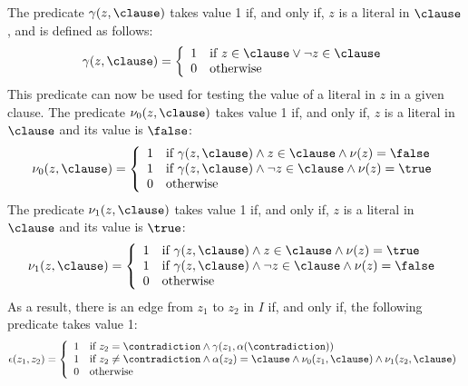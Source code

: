 \begin{definition}
    The predicate $\gamma(z, \clause)$ takes value 1 if, and only if, $z$
    is a literal in $\clause$, and is defined as follows:
    \begin{equation}
        \gamma(z, \clause) = 
        \left\{
            \begin{array}{ll}
                1 & \text{if $z \in \clause \lor \neg z \in \clause$} \\
                0 & \text{otherwise}
            \end{array}
        \right.
    \end{equation}
    This predicate can now be used for testing the value of a literal in $z$ in
    a given clause. The predicate $\nu_0(z, \clause)$ takes value 1 if, and only
    if, $z$ is a literal in $\clause$ and its value is $\false$:
    \begin{equation}
        \nu_0(z, \clause) = 
        \left\{
            \begin{array}{ll}
                1 & \text{if $\gamma(z, \clause) \land z \in \clause \land \nu(z) = \false$}\\
                1 & \text{if $\gamma(z, \clause) \land \neg z \in \clause \land
                \nu(z) = \true$}\\
                0 & \text{otherwise}
            \end{array}
        \right.
    \end{equation}
    The predicate $\nu_1(z, \clause)$ takes value 1 if, and only if, $z$ is a
    literal in $\clause$ and its value is $\true$:
    \begin{equation}
        \nu_1(z, \clause) = 
        \left\{
            \begin{array}{ll}
                1 & \text{if $\gamma(z, \clause) \land z \in \clause \land
                \nu(z) = \true$}\\
                1 & \text{if $\gamma(z, \clause) \land \neg z \in \clause \land
                \nu(z) = \false$}\\
                0 & \text{otherwise}
            \end{array}
        \right.
    \end{equation}
    As a result, there is an edge from $z_1$ to $z_2$ in $I$ if, and only if,
    the following predicate takes value 1:
    \begin{equation}
        \epsilon(z_1, z_2) = 
        \left\{
            \begin{array}{ll}
                1 & \text{if $z_2 = \contradiction \land \gamma(z_1, \alpha(\contradiction))$}\\
                1 & \text{if $z_2 \neq \contradiction \land \alpha(z_2) = \clause \land \nu_0(z_1, \clause) \land \nu_1(z_2, \clause)$}\\
                0 & \text{otherwise}
            \end{array}
        \right.
    \end{equation}
\end{definition}

